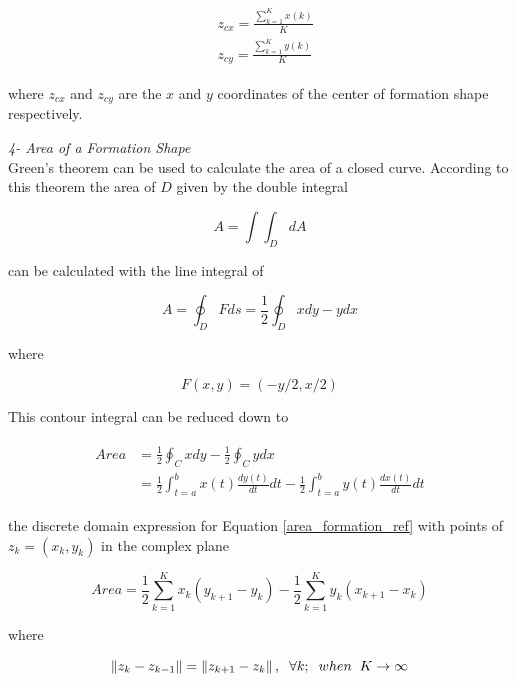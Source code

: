 \begin{align}
\begin{split}
&z_{cx} = \frac{\sum_{k=1}^{K}x(k)}{K}  \\
&z_{cy} = \frac{\sum_{k=1}^{K}y(k)}{K}  
\end{split}
\end{align}
		
where $z_{cx}$ and $z_{cy}$ are the $x$ and $y$ coordinates of the center of formation shape respectively.

\textit{ 	4- Area of a Formation Shape} \\ 		
Green's theorem can be used to calculate the area of a closed curve. According to this theorem the area of $D$ given by the double integral

\begin{equation}
 A = \int\int_D dA
\end{equation}
		
can be calculated with the line integral of

\begin{equation}
 A = \oint_D F ds = \frac{1}{2} \oint_D xdy - ydx
\end{equation}

where

\begin{equation}
F(x,y) = (-y/2,x/2)
\end{equation}
		
This contour integral can be reduced down to

\begin{align} \label{area_formation_ref}
\begin{split}
Area &= \frac{1}{2} \oint_C xdy - \frac{1}{2} \oint_C ydx \\
&= \frac{1}{2} \int_{t=a}^{b} x(t)\frac{dy(t)}{dt}dt - \frac{1}{2} \int_{t=a}^{b}y(t)\frac{dx(t)}{dt}dt
\end{split}
\end{align}
		
the discrete domain expression for Equation \ref{area_formation_ref} with points of  $z_k = (x_k,y_k)$ in the complex plane
			
\begin{equation}
Area = \frac{1}{2} \sum_{k=1}^{K} x_k(y_{k+1} - y_k) - \frac{1}{2} \sum_{k=1}^{K}y_k(x_{k+1} - x_k)
\end{equation}
			
where

\begin{equation}
\left\lVert z_k - z_{k-1}\right\rVert = \left\lVert z_{k+1} - z_k\right\rVert, \hspace{0.2cm}  \forall k ;  \hspace{0.2cm} when  \hspace{0.2cm} K \to\infty
\end{equation}

